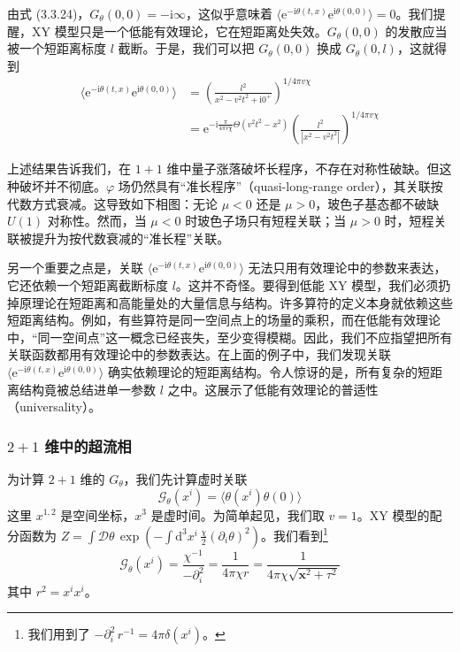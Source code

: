由式 (3.3.24)，$G_{\theta}(0,0)=-\mathrm{i}\infty$，这似乎意味着 $\langle\mathrm{e}^{-\mathrm{i}\theta(t,x)}\mathrm{e}^{\mathrm{i}\theta(0,0)}\rangle=0$。我们提醒，XY 模型只是一个低能有效理论，它在短距离处失效。$G_{\theta}(0,0)$ 的发散应当被一个短距离标度 $l$ 截断。于是，我们可以把 $G_{\theta}(0,0)$ 换成 $G_{\theta}(0,l)$，这就得到
\begin{align*}
\big\langle\mathrm{e}^{-\mathrm{i}\theta(t,x)}\mathrm{e}^{\mathrm{i}\theta(0,0)}\big\rangle&=\left(\frac{l^2}{x^2-v^2t^2+\mathrm{i}0^+}\right)^{1/4\pi v\chi}\\
&=\mathrm{e}^{-\mathrm{i}\frac{\pi}{4\pi v\chi}\Theta(v^2t^2-x^2)}\left(\frac{l^2}{|x^2-v^2t^2|}\right)^{1/4\pi v\chi} \tag{3.3.25}
\end{align*}

上述结果告诉我们，在 $1+1$ 维中量子涨落破坏长程序，不存在对称性破缺。但这种破坏并不彻底。$\varphi$ 场仍然具有“准长程序”（quasi-long-range order），其关联按代数方式衰减。这导致如下相图：无论 $\mu<0$ 还是 $\mu>0$，玻色子基态都不破缺 $U(1)$ 对称性。然而，当 $\mu<0$ 时玻色子场只有短程关联；当 $\mu>0$ 时，短程关联被提升为按代数衰减的“准长程”关联。

另一个重要之点是，关联 $\langle\mathrm{e}^{-\mathrm{i}\theta(t,x)}\mathrm{e}^{\mathrm{i}\theta(0,0)}\rangle$ 无法只用有效理论中的参数来表达，它还依赖一个短距离截断标度 $l$。这并不奇怪。要得到低能 XY 模型，我们必须扔掉原理论在短距离和高能量处的大量信息与结构。许多算符的定义本身就依赖这些短距离结构。例如，有些算符是同一空间点上的场量的乘积，而在低能有效理论中，“同一空间点”这一概念已经丧失，至少变得模糊。因此，我们不应指望把所有关联函数都用有效理论中的参数表达。在上面的例子中，我们发现关联 $\langle\mathrm{e}^{-\mathrm{i}\theta(t,x)}\mathrm{e}^{\mathrm{i}\theta(0,0)}\rangle$ 确实依赖理论的短距离结构。令人惊讶的是，所有复杂的短距离结构竟被总结进单一参数 $l$ 之中。这展示了低能有效理论的普适性（universality）。

\subsubsection{$2+1$ 维中的超流相}

为计算 $2+1$ 维的 $G_{\theta}$，我们先计算虚时关联
\begin{equation*}
\mathcal{G}_{\theta}(x^i)=\langle\theta(x^i)\theta(0)\rangle
\end{equation*}
这里 $x^{1,2}$ 是空间坐标，$x^3$ 是虚时间。为简单起见，我们取 $v=1$。XY 模型的配分函数为 $Z=\int\mathcal{D}\theta\,\exp(-\int\mathrm{d}^3x^i\,\frac{\chi}{2}(\partial_i\theta)^2)$。我们看到\footnote{我们用到了 $-\partial_i^2\,r^{-1}=4\pi\delta(x^i)$。}
\begin{equation*}
\mathcal{G}_{\theta}(x^i)=\frac{\chi^{-1}}{-\partial_i^2}=\frac{1}{4\pi\chi r}=\frac{1}{4\pi\chi\sqrt{\pmb{x}^2+\tau^2}}
\end{equation*}
其中 $r^2=x^ix^i$。

